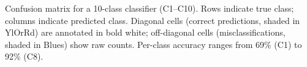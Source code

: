 \caption{Confusion matrix for a 10-class classifier (C1--C10). Rows indicate true class; columns indicate predicted class. Diagonal cells (correct predictions, shaded in YlOrRd) are annotated in bold white; off-diagonal cells (misclassifications, shaded in Blues) show raw counts. Per-class accuracy ranges from 69\% (C1) to 92\% (C8).}
